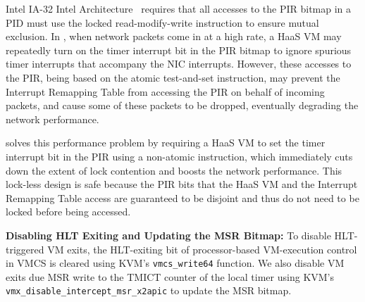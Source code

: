 
Intel IA-32 Intel Architecture~\cite{sdm:2018}  requires that all accesses to the PIR bitmap in a PID
must use the locked read-modify-write instruction to ensure mutual exclusion. 
In \sna, when network packets come in at a high rate, a HaaS VM may repeatedly turn 
on the timer interrupt bit in the PIR bitmap to ignore  spurious timer interrupts that 
accompany the NIC interrupts. However, these accesses to the PIR, being based on the
atomic test-and-set instruction, may prevent the Interrupt Remapping Table from 
accessing the PIR on behalf of incoming packets, and cause some of these 
packets to be dropped, eventually degrading the network performance.
 
\na solves this performance problem by requiring a HaaS VM to set the timer interrupt bit
in the PIR using a non-atomic instruction, which immediately cuts down the extent of lock contention
and boosts the network performance. This lock-less design is safe because the PIR bits 
that the HaaS VM and the Interrupt Remapping Table access are guaranteed to be 
disjoint and thus do not need to be locked before being accessed.

{\bf Disabling HLT Exiting and Updating the MSR Bitmap:}
To disable HLT-triggered VM exits, the HLT-exiting bit of
processor-based VM-execution control in VMCS is cleared
using KVM's \texttt{vmcs\_write64} function.
We also disable VM exits due MSR write to the TMICT counter of the local timer
using KVM's \texttt{vmx\_disable\_intercept\_msr\_x2apic} to update the MSR bitmap. 


